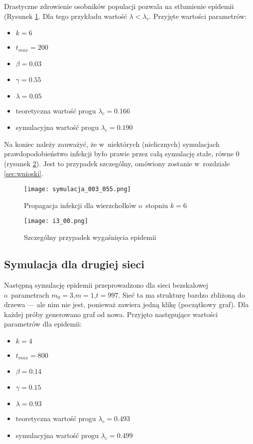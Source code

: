 \begin{enumerate}
Drastyczne zdrowienie osobników populacji pozwala na stłumienie epidemii (Rysunek \ref{fig:symulacja_003_055.png}. Dla tego przykładu wartość $\lambda < \lambda_c$. Przyjęte wartości parametrów:
\begin{itemize}[nolistsep]
\item $k = 6$
\item $t_{max} = 200$
\item $\beta = 0.03$
\item $\gamma = 0.55$
\item \textbf{$\lambda = 0.05$}
\item teoretyczna wartość progu $\lambda_c = 0.166$
\item symulacyjna wartość progu $\lambda_c = 0.190$
\end{itemize}

Na koniec należy zauważyć, że w~niektórych (nielicznych) symulacjach prawdopodobieństwo infekcji było prawie przez całą symulację stałe, równe 0 (rysunek \ref{fig:i3_00}). Jest to przypadek szczególny, omówiony zostanie w~rozdziale \ref{sec:wnioski}.

\begin{figure}[H]
\centering
\texttt{[image: symulacja\_003\_055.png]}
\caption{\small Propagacja infekcji dla wierzchołków o~stopniu $k=6$}
\label{fig:symulacja_003_055.png}
\end{figure}

\begin{figure}[H]
\centering
\texttt{[image: i3\_00.png]}
\caption{\small Szczególny przypadek wygaśnięcia epidemii}
\label{fig:i3_00}
\end{figure}

\subsection{Symulacja dla drugiej sieci}
\label{subsec:sym_druga_siec}

Następną symulację epidemii przeprowadzono dla sieci bezskalowej o~parametrach $m_0 = 3$,$m = 1$,$t = 997$. Sieć ta ma strukturę bardzo zbliżoną do drzewa --- ale nim nie jest, ponieważ zawiera jedną klikę (początkowy graf). Dla każdej próby generowano graf od nowa. Przyjęto następujące wartości parametrów dla epidemii:
\begin{itemize}[nolistsep]
\item $k = 4$
\item $t_{max} = 800$
\item $\beta = 0.14$
\item $\gamma = 0.15$
\item $\lambda = 0.93$
\item teoretyczna wartość progu $\lambda_c = 0.493$
\item symulacyjna wartość progu $\lambda_c = 0.499$
\end{itemize}


\end{enumerate}
